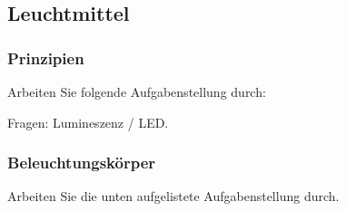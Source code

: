 \subsection{Leuchtmittel}
\subsubsection{Prinzipien}
Arbeiten Sie folgende Aufgabenstellung durch:

Fragen: Lumineszenz / LED.

\subsubsection{Beleuchtungskörper}

Arbeiten Sie die unten aufgelistete Aufgabenstellung durch.

\clearpage

